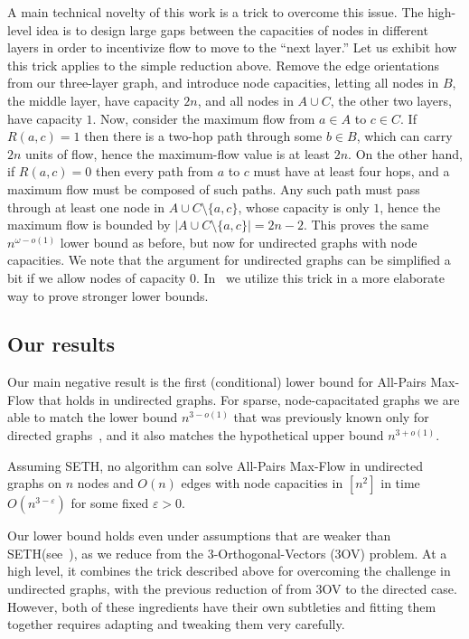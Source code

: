 \documentclass{toc}
\theoremstyle{plain}
\newcommand{\ProblemName}[1]{\textsf{#1}}
\newcommand{\SETH}{SETH\xspace}
\newcommand{\APMF}{\ProblemName{All-Pairs Max-Flow}\xspace}
\newcommand{\TOV}{\ProblemName{$3$OV}\xspace}
\newcommand\eps{\varepsilon}
\begin{document}
A main technical novelty of this work is a trick to overcome this issue. The high-level idea is to design large gaps between the capacities of nodes in different layers in order to incentivize flow to move to the ``next layer.''
Let us exhibit how this trick applies to the simple reduction above.
Remove the edge orientations from our three-layer graph,
and introduce node capacities,
letting all nodes in $B$, the middle layer, have capacity $2n$,
and all nodes in $A \cup C$, the other two layers, have capacity $1$.
Now, consider the maximum flow from $a \in A$ to $c \in C$.
If $R(a,c)=1$ then there is a two-hop path through some $b \in B$,
which can carry $2n$ units of flow,
hence the maximum-flow value is at least $2n$.
On the other hand, if $R(a,c)=0$ then every path from $a$ to $c$
must have at least four hops, and a maximum flow must be composed of such paths.
Any such path must pass through at least one node in
$A \cup C\setminus\{a,c\}$, whose capacity is only $1$,
hence the maximum flow is bounded by $|A \cup C \setminus \{ a,c \}| = 2n-2$.
This proves the same $n^{\omega-o(1)}$ lower bound as before,
but now for undirected graphs with node capacities.
We note that the argument for undirected graphs can be simplified a bit if we allow nodes of capacity $0$.
In~ we utilize this trick in a more elaborate way to prove stronger lower bounds.

\subsection{Our results}

Our main negative result is the first (conditional) lower bound for \APMF that holds in undirected graphs.
For sparse, node-capacitated graphs we are able to match the lower bound $n^{3-o(1)}$ that was previously known only for directed graphs~\cite{KT18},
and it also matches the hypothetical upper bound $n^{3+o(1)}$.

\begin{theorem}
\label{thm1}
Assuming \SETH, no algorithm can solve \APMF in undirected graphs on $n$ nodes and $O(n)$ edges with node capacities in $[n^2]$ in time $O(n^{3-\eps})$
for some fixed $\eps>0$.
\end{theorem}

Our lower bound holds even under assumptions that are weaker than \SETH (see~), as we reduce from the $3$-Orthogonal-Vectors (\TOV) problem.
At a high level, it combines the trick described above for overcoming the challenge in undirected graphs, with the previous reduction of \cite{KT18} from \TOV to the directed case.
However, both of these ingredients have their own subtleties and fitting them together requires adapting and tweaking them very carefully.
\end{document}
